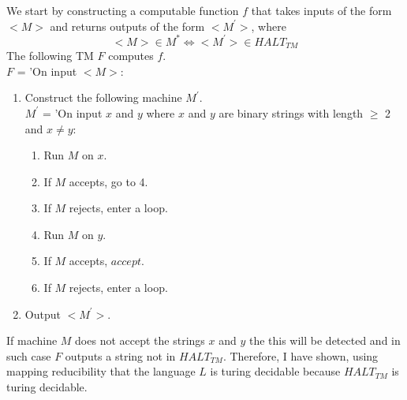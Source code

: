 \documentclass[a4paper,12pt]{article}
\begin{document}
\begin{enumerate}[label=\alph*)]
We start by constructing a computable function $f$ that takes inputs of the form $<M>$ and returns outputs of the form $<M^{'}>$, where 
$$<M> \in M^{*} \iff <M^{'}> \in HALT_{TM}$$
The following TM $F$ computes $f$. \\
$F$ = 'On input $<M>$:
\begin{enumerate}[label=\arabic*)]
\item Construct the following machine $M^{'}$. \\
$M^{'}$ = 'On input $x$ and $y$ where $x$ and $y$ are binary strings with length $\geq$ 2 and $x \neq y$: 
\begin{enumerate}[label=\arabic*)]
\item Run $M$ on $x$.
\item If $M$ accepts, go to 4.
\item If $M$ rejects, enter a loop.
\item Run $M$ on $y$.
\item If $M$ accepts, $accept$.
\item If $M$ rejects, enter a loop.
\end{enumerate}
\item Output $<M^{'}>$.
\end{enumerate}
If machine $M$ does not accept the strings $x$ and $y$ the this will be detected and in such case $F$ outputs a string not in $HALT_{TM}$. Therefore, I have shown, using mapping reducibility that the language $L$ is turing decidable because $HALT_{TM}$ is turing decidable. 
\end{enumerate}
\newpage
\begin{enumerate}[label=\alph*)]

\end{enumerate}
\end{document}
